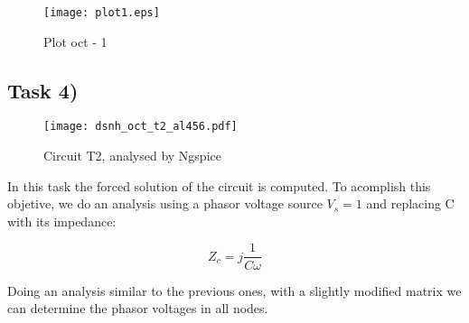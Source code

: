 \begin{figure}[H]
	\centering
	\texttt{[image: plot1.eps]}
	\caption{Plot oct - 1}
\label{fig:Dsnh_sim_t2}
\end{figure}


\subsection{Task 4)}
\label{subsec:task4_a}

\begin{figure}[H]
	\centering
	\texttt{[image: dsnh\_oct\_t2\_al456.pdf]}
	\caption{Circuit T2, analysed by Ngspice}
\label{fig:Dsnh_sim_t2}
\end{figure}
\newpage

In this task the forced solution of the circuit is computed. To acomplish this objetive, we do an analysis using a phasor voltage source $V_s=1$ and replacing C with its impedance:

\[
Z_c = j\frac{1}{C\omega}
\]

Doing an analysis similar to the previous ones, with a slightly modified matrix we can determine the phasor voltages in all nodes.

